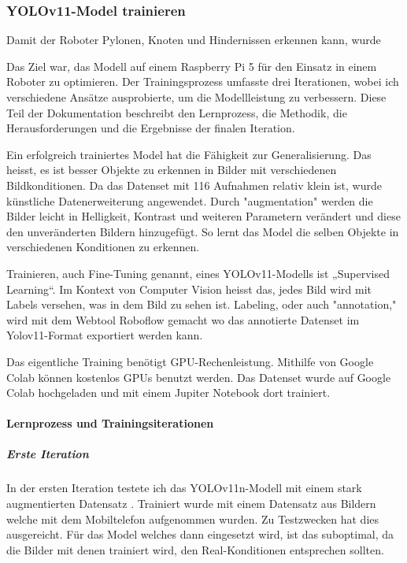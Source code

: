 \subsubsection{YOLOv11-Model trainieren}

Damit der Roboter Pylonen, Knoten und Hindernissen erkennen kann, wurde

Das Ziel war, das Modell auf einem Raspberry Pi 5 für den Einsatz in einem Roboter zu optimieren. Der Trainingsprozess umfasste drei Iterationen, wobei ich verschiedene Ansätze ausprobierte, um die Modellleistung zu verbessern. Diese Teil der Dokumentation beschreibt den Lernprozess, die Methodik, die Herausforderungen und die Ergebnisse der finalen Iteration.

Ein erfolgreich trainiertes Model hat die Fähigkeit zur Generalisierung. Das heisst, es ist besser Objekte zu erkennen in Bilder mit verschiedenen Bildkonditionen. Da das Datenset mit 116 Aufnahmen relativ klein ist, wurde künstliche Datenerweiterung angewendet. Durch "augmentation" werden die Bilder leicht in Helligkeit, Kontrast und weiteren Parametern verändert und diese den unveränderten Bildern hinzugefügt. So lernt das Model die selben Objekte in verschiedenen Konditionen zu erkennen.

Trainieren, auch Fine-Tuning genannt, eines YOLOv11-Modells ist „Supervised Learning“. Im Kontext von Computer Vision heisst das, jedes Bild wird mit Labels versehen, was in dem Bild zu sehen ist. Labeling, oder auch "annotation," wird mit dem Webtool Roboflow gemacht wo das annotierte Datenset im Yolov11-Format exportiert werden kann. 

Das eigentliche Training benötigt GPU-Rechenleistung. Mithilfe von Google Colab können kostenlos GPUs benutzt werden. Das Datenset wurde auf Google Colab hochgeladen und mit einem Jupiter Notebook dort trainiert.

\paragraph{Lernprozess und Trainingsiterationen}

\subparagraph{Erste Iteration}

In der ersten Iteration testete ich das YOLOv11n-Modell mit einem stark augmentierten Datensatz . Trainiert wurde mit einem Datensatz aus Bildern welche mit dem Mobiltelefon aufgenommen wurden. Zu Testzwecken hat dies ausgereicht. Für das Model welches dann eingesetzt wird, ist das suboptimal, da die Bilder mit denen trainiert wird, den Real-Konditionen entsprechen sollten.

